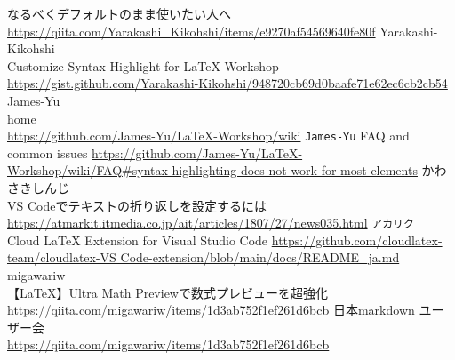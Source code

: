 \documentclass{ltjsarticle}
\begin{document}
\begin{thebibliography}{999}
  なるべくデフォルトのまま使いたい人へ\\
  \url{https://qiita.com/Yarakashi_Kikohshi/items/e9270af54569640fe80f}
  Yarakashi-Kikohshi\\
  Customize Syntax Highlight for LaTeX Workshop\\
  \url{https://gist.github.com/Yarakashi-Kikohshi/948720cb69d0baafe71e62ec6cb2cb54}
  James-Yu\\
  home\\
  \url{https://github.com/James-Yu/LaTeX-Workshop/wiki}
  \verb|James-Yu|
  FAQ and common issues
  \url{https://github.com/James-Yu/LaTeX-Workshop/wiki/FAQ#syntax-highlighting-does-not-work-for-most-elements}
  かわさきしんじ\\
  VS Codeでテキストの折り返しを設定するには\\
  \url{https://atmarkit.itmedia.co.jp/ait/articles/1807/27/news035.html}
  \verb|アカリク|\\
  Cloud LaTeX Extension for Visual Studio Code
  \url{https://github.com/cloudlatex-team/cloudlatex-VS Code-extension/blob/main/docs/README_ja.md}
  migawariw\\
  【LaTeX】Ultra Math Previewで数式プレビューを超強化\\
  \url{https://qiita.com/migawariw/items/1d3ab752f1ef261d6bcb}
  日本markdown ユーザー会\\
  \url{https://qiita.com/migawariw/items/1d3ab752f1ef261d6bcb}
\end{thebibliography}
\end{document}
